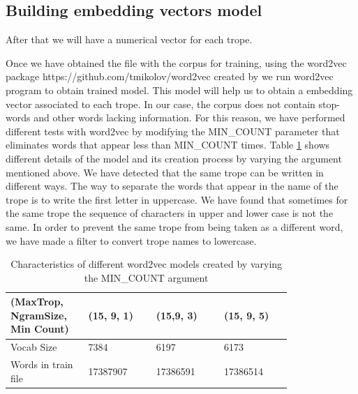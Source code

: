 \documentclass[letterpaper]{article}
\begin{document}
	
	\subsection{Building embedding vectors model}
	
	After that we will have a numerical vector for each trope.
	
	Once we have obtained the file with the corpus for training, using the word2vec package https://github.com/tmikolov/word2vec created by
	\cite{mikolov2013} we run word2vec program to obtain trained model. This model will help us to obtain a embedding vector associated to each trope.
	In our case, the corpus does not contain stop-words and other words lacking information. For this reason, we have performed different tests with
	word2vec by modifying the MIN\_COUNT parameter that eliminates words that appear less than MIN\_COUNT times. Table \ref{tab:variations-with-min-count-argument-15-9}
	shows different details of the model and its creation process by varying the argument mentioned above.
	We have detected that the same trope can be written in different ways. The way to separate the words that appear in the name of the trope is to write
	the first letter in uppercase. We have found that sometimes for the same trope the sequence of characters in upper and lower case is not the same. 
	In order to prevent the same trope from being taken as a different word, we have made a filter to convert trope names to lowercase.
	
	
	\begin{table}[t]
		\centering
		\begin{tabular}{|p{0.20\linewidth}|p{0.2\linewidth}|p{0.2\linewidth}|p{0.2\linewidth}|}
			\hline
			\textbf{(MaxTrop, NgramSize, Min Count)}& \textbf{(15, 9, 1)} & \textbf{(15,9, 3)} & \textbf{(15, 9, 5)}\\
			\hline
			\hline
			Vocab Size& 7384 & 6197 & 6173 \\
			\hline
			Words in train file& 17387907 & 17386591 & 17386514 \\
			\hline 
			
		\end{tabular}
		\caption{Characteristics of different word2vec models created by varying the MIN\_COUNT argument}
		\label{tab:variations-with-min-count-argument-15-9}
	\end{table}	
	
\end{document}

